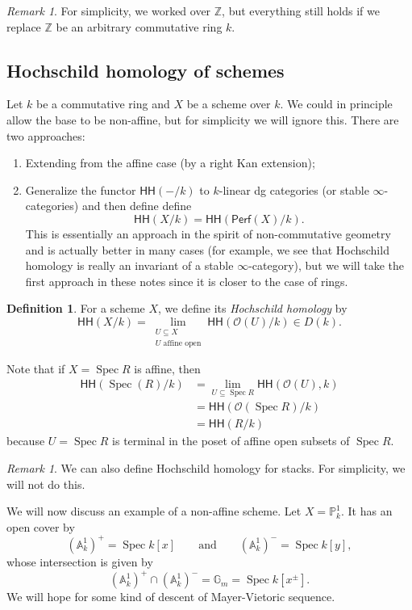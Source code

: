 \documentclass[10pt]{amsart}
\theoremstyle{definition}
\newtheorem{defn}[thm]{Definition}
\theoremstyle{remark}
\newtheorem{rmk}[thm]{Remark}
\theoremstyle{plain}
\theoremstyle{definition}
\theoremstyle{remark}
\newcommand{\A}{\mathbb{A}}
\newcommand{\G}{\mathbb{G}}
\newcommand{\Z}{\mathbb{Z}}
\renewcommand{\P}{\mathbb{P}}
\newcommand{\mc}[1]{\mathcal{#1}}
\newcommand{\ms}[1]{\mathsf{#1}}
\newcommand{\1}{\mathbf{1}}
\newcommand{\2}{\mathbf{2}}
\newcommand{\3}{\mathbf{3}}
\newcommand{\HH}{\ms{HH}}
\DeclareMathOperator{\Spec}{Spec}
\begin{document}
\begin{rmk}
    For simplicity, we worked over $\Z$, but everything still holds if we replace $\Z$ be an arbitrary commutative ring $k$.
\end{rmk}

\subsection{Hochschild homology of schemes}%
\label{sub:Hochschild homology of schemes}

Let $k$ be a commutative ring and $X$ be a scheme over $k$. We could in principle allow the base to be non-affine, but for simplicity we will ignore this. There are two approaches:
\begin{enumerate}
    \item Extending from the affine case (by a right Kan extension);
    \item Generalize the functor $\HH(-/k)$ to $k$-linear dg categories (or stable $\infty$-categories) and then define define
    \[ \HH(X/k) = \HH(\ms{Perf}(X)/k). \]
    This is essentially an approach in the spirit of non-commutative geometry and is actually better in many cases (for example, we see that Hochschild homology is really an invariant of a stable $\infty$-category), but we will take the first approach in these notes since it is closer to the case of rings.
\end{enumerate}

\begin{defn}
    For a scheme $X$, we define its \textit{Hochschild homology} by
    \[ \HH(X/k) = \lim_{\substack{U \subseteq X \\ U \text{ affine open}}} \HH(\mc{O}(U)/k) \in D(k). \]
\end{defn}

Note that if $X = \Spec R$ is affine, then
\begin{align*}
    \HH(\Spec(R)/k) &= \lim_{U \subseteq \Spec R} \HH(\mc{O}(U), k) \\
    &= \HH(\mc{O}(\Spec R)/k) \\
    &= \HH(R/k)
\end{align*}
because $U = \Spec R$ is terminal in the poset of affine open subsets of $\Spec R$.

\begin{rmk}
    We can also define Hochschild homology for stacks. For simplicity, we will not do this.
\end{rmk}


We will now discuss an example of a non-affine scheme. Let $X = \P^1_k$. It has an open cover by
\[ (\A^1_k)^+ = \Spec k[x] \qquad \text{and} \qquad (\A_k^1)^- = \Spec k[y], \]
whose intersection is given by
\[ (\A_k^1)^+ \cap (\A_k^1)^- = \G_m = \Spec k[x^{\pm}]. \]
We will hope for some kind of descent of Mayer-Vietoric sequence.
\end{document}
